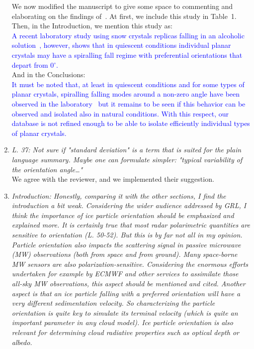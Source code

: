 \documentclass[12pt]{article}
\newcommand*{\blue}{\textcolor{blue}}
\begin{document}
\begin{enumerate}
    We now modified the manuscript to give some space to commenting and elaborating on the findings of~\cite{Stout_ACP_2024}. At first, we include this study in Table~1. Then, in the Introduction, we mention this study as:\\
    \blue{ A recent laboratory study using snow crystals replicas falling in an alcoholic solution~\cite{Stout_ACP_2024}, however, shows that in quiescent conditions individual planar crystals may have a spiralling fall regime with preferential orientations that depart from 0$^\circ$. }\\

    And in the Conclusions:\\
    \blue{It must be noted that, at least in quiescent conditions and for some types of planar crystals, spiralling falling modes around a non-zero angle have been observed in the laboratory~\cite{Stout_ACP_2024} but it remains to be seen if this behavior can be observed and isolated also in natural conditions. With this respect, our database is not refined enough to be able to isolate efficiently individual types of planar crystals. }\\
    
    \item \textit{L. 37: Not sure if "standard deviation" is a term that is suited for the plain language summary. Maybe one can formulate simpler: "typical variability of the orientation angle\dots"}\\

    \noindent
    We agree with the reviewer, and we implemented their suggestion. \\

    \item \textit{Introduction: Honestly, comparing it with the other sections, I find the introduction a bit weak. Considering the wider audience addressed by GRL, I think the importance of ice particle orientation should be emphasized and explained more. It is certainly true that most radar polarimetric quantities are sensitive to orientation (L. 50-52). But this is by far not all in my opinion. Particle orientation also impacts the scattering signal in passive microwave (MW) observations (both from space and from ground). Many space-borne MW sensors are also polarization-sensitive. Considering the enormous efforts undertaken for example by ECMWF and other services to assimilate those all-sky MW observations, this aspect should be mentioned and cited. Another aspect is that an ice particle falling with a preferred orientation will have a very different sedimentation velocity. So characterizing the particle orientation is quite key to simulate its terminal velocity (which is quite an important parameter in any cloud model). Ice particle orientation is also relevant for determining cloud radiative properties such as optical depth or albedo.}
    

\end{enumerate}
\end{document}
